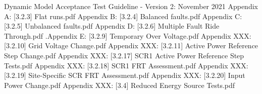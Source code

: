 \renewcommand\bibname{References}

\begin{thebibliography}{99}
	Dynamic Model Acceptance Test Guideline - Version 2: November 2021
	Appendix A: [3.2.3] Flat runs.pdf
	Appendix B: [3.2.4] Balanced faults.pdf
	Appendix C: [3.2.5] Unbalanced faults.pdf
	Appendix D: [3.2.6] Multiple Fault Ride Through.pdf
	.Appendix E: [3.2.9] Temporary Over Voltage.pdf
	Appendix XXX: [3.2.10] Grid Voltage Change.pdf
	Appendix XXX: [3.2.11] Active Power Reference Step Change.pdf
	Appendix XXX: [3.2.17] SCR1 Active Power Reference Step Tests.pdf
	Appendix XXX: [3.2.18] SCR1 FRT Assessment.pdf
	Appendix XXX: [3.2.19] Site-Specific SCR FRT Assessment.pdf
	Appendix XXX: [3.2.20] Input Power Change.pdf
	Appendix XXX: [3.4] Reduced Energy Source Tests.pdf
\end{thebibliography}